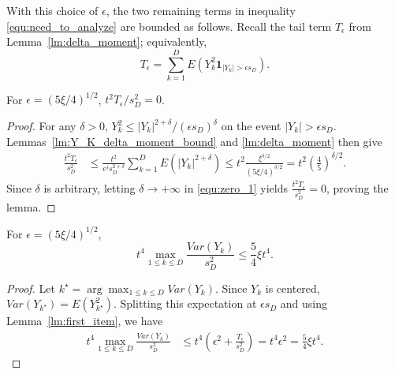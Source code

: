 With this choice of $\epsilon$, the two remaining terms in inequality \ref{equ:need_to_analyze} are bounded as follows. Recall the tail term $T_\epsilon$ from Lemma~\ref{lm:delta_moment}; equivalently,
\begin{equation}
T_\epsilon=\sum_{k=1}^{D}
E(Y_k^2\mathbf{1}_{|Y_k|>\epsilon s_D}) .
\label{equ:tail_term_expectation}
\end{equation}
\begin{lemma}\label{lm:first_item}
For $\epsilon=(5\xi/4)^{1/2}$, $t^2T_\epsilon/s_D^2=0$.
\begin{proof}
For any $\delta>0$, $Y_k^2\leq |Y_k|^{2+\delta}/(\epsilon s_D)^\delta$ on the event $|Y_k|>\epsilon s_D$. Lemmas~\ref{lm:Y_K_delta_moment_bound} and \ref{lm:delta_moment} then give
\begin{align}
\frac{t^2T_\epsilon}{s_D^2}
&\leq\!
\frac{t^2}{\epsilon^\delta s_D^{2+\delta}}
\sum_{k=1}^{D}E(|Y_k|^{2+\delta})
\leq\!
t^2\frac{\xi^{\delta/2}}{(5\xi/4)^{\delta/2}}
=t^2\left(\frac{4}{5}\right)^{\delta/2}.
\label{equ:zero_1}
\end{align}
Since $\delta$ is arbitrary, letting $\delta\to+\infty$ in \eqref{equ:zero_1} yields $\frac{t^2T_\epsilon}{s_D^2}=0$, proving the lemma.
\end{proof}
\end{lemma}

\begin{lemma}\label{lm:sec_term}
For $\epsilon=(5\xi/4)^{1/2}$,
\[
t^4\max_{1\leq k\leq D}\frac{Var(Y_k)}{s_D^2}
\leq \frac{5}{4}\xi t^4 .
\]
\begin{proof}
Let $k^\star=\arg\max_{1\leq k\leq D}Var(Y_k)$. Since $Y_k$ is centered, $Var(Y_{k^\star})=E(Y_{k^\star}^2)$. Splitting this expectation at $\epsilon s_D$ and using Lemma~\ref{lm:first_item}, we have
\begin{align}
t^4\max_{1\leq k\leq D}\frac{Var(Y_k)}{s_D^2}
&\leq t^4\left(\epsilon^2+\frac{T_\epsilon}{s_D^2}\right)
=t^4\epsilon^2
=\frac{5}{4}\xi t^4 .
\label{equ:sec_term}
\end{align}
\end{proof}
\end{lemma}

